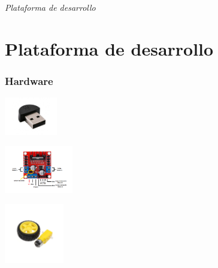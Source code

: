 \documentclass{beamer}
\begin{document}
\section*{}
\begin{frame}{}
  \centering \Huge
  \emph{Plataforma de desarrollo}
\end{frame}


\section{Plataforma de desarrollo}
\begin{frame}
\frametitle{Hardware}
\centering

\begin{minipage}{0.3\textwidth}
    \centering
    \includegraphics[width=2.3cm]{figs/microfono-usb.jpg}
\end{minipage}
\hfill
\begin{minipage}{0.3\textwidth}
    \centering
    \includegraphics[width=3.0cm]{figs/L298N.png}
\end{minipage}
\hfill
\begin{minipage}{0.3\textwidth}
    \centering
    \includegraphics[width=2.6cm]{figs/motor.jpg}
\end{minipage}

\vspace{-0.3cm} %



\end{frame}
\end{document}
